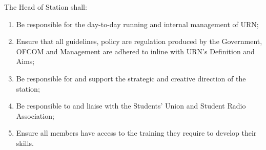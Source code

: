\item The Head of Station shall:
\begin{enumerate}[label*=\arabic*.]
    \item Be responsible for the day-to-day running and internal management of URN;
    \item Ensure that all guidelines, policy are regulation produced by the Government, OFCOM and Management are adhered to inline with URN's Definition and Aims;
    \item Be responsible for and support the strategic and creative direction of the station;
    \item Be responsible to and liaise with the Students' Union and Student Radio Association;
    \item Ensure all members have access to the training they require to develop their skills.
\end{enumerate}
